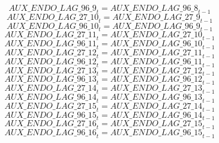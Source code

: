 \begin{dmath}
{AUX\_ENDO\_LAG\_96\_9}_{t}={AUX\_ENDO\_LAG\_96\_8}_{t-1}
\end{dmath}
\begin{dmath}
{AUX\_ENDO\_LAG\_27\_10}_{t}={AUX\_ENDO\_LAG\_27\_9}_{t-1}
\end{dmath}
\begin{dmath}
{AUX\_ENDO\_LAG\_96\_10}_{t}={AUX\_ENDO\_LAG\_96\_9}_{t-1}
\end{dmath}
\begin{dmath}
{AUX\_ENDO\_LAG\_27\_11}_{t}={AUX\_ENDO\_LAG\_27\_10}_{t-1}
\end{dmath}
\begin{dmath}
{AUX\_ENDO\_LAG\_96\_11}_{t}={AUX\_ENDO\_LAG\_96\_10}_{t-1}
\end{dmath}
\begin{dmath}
{AUX\_ENDO\_LAG\_27\_12}_{t}={AUX\_ENDO\_LAG\_27\_11}_{t-1}
\end{dmath}
\begin{dmath}
{AUX\_ENDO\_LAG\_96\_12}_{t}={AUX\_ENDO\_LAG\_96\_11}_{t-1}
\end{dmath}
\begin{dmath}
{AUX\_ENDO\_LAG\_27\_13}_{t}={AUX\_ENDO\_LAG\_27\_12}_{t-1}
\end{dmath}
\begin{dmath}
{AUX\_ENDO\_LAG\_96\_13}_{t}={AUX\_ENDO\_LAG\_96\_12}_{t-1}
\end{dmath}
\begin{dmath}
{AUX\_ENDO\_LAG\_27\_14}_{t}={AUX\_ENDO\_LAG\_27\_13}_{t-1}
\end{dmath}
\begin{dmath}
{AUX\_ENDO\_LAG\_96\_14}_{t}={AUX\_ENDO\_LAG\_96\_13}_{t-1}
\end{dmath}
\begin{dmath}
{AUX\_ENDO\_LAG\_27\_15}_{t}={AUX\_ENDO\_LAG\_27\_14}_{t-1}
\end{dmath}
\begin{dmath}
{AUX\_ENDO\_LAG\_96\_15}_{t}={AUX\_ENDO\_LAG\_96\_14}_{t-1}
\end{dmath}
\begin{dmath}
{AUX\_ENDO\_LAG\_27\_16}_{t}={AUX\_ENDO\_LAG\_27\_15}_{t-1}
\end{dmath}
\begin{dmath}
{AUX\_ENDO\_LAG\_96\_16}_{t}={AUX\_ENDO\_LAG\_96\_15}_{t-1}
\end{dmath}
